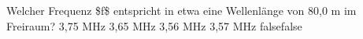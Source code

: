     {Welcher Frequenz \$f\$ entspricht in etwa eine Wellenlänge von 80,0 m im Freiraum?}
    {3,75 MHz}
    {3,65 MHz}
    {3,56 MHz}
    {3,57 MHz}
    {false}{false}